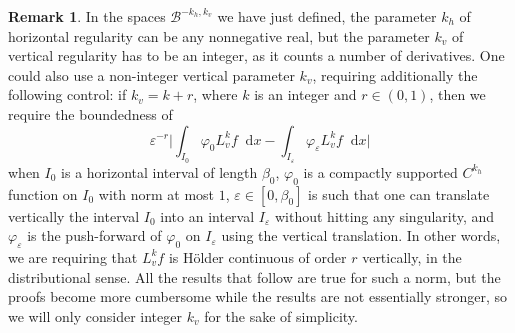 \documentclass[10pt]{amsart}
\newcommand{\boB}{\mathcal{B}}
\newcommand{\dd}{\mathop{}\!\mathrm{d}}
\newcommand{\absgg}[1]{\biggl \lvert#1\biggr\rvert}
\let\epsilon\varepsilon
\let\phi\varphi
\theoremstyle{definition}
\newtheorem{rmk}[thm]{Remark}
\numberwithin{equation}{section}
\begin{document}
\begin{rmk}
\label{rmk:non_integers} In the spaces $\boB^{-k_h, k_v}$ we have just
defined, the parameter $k_h$ of horizontal regularity can be any nonnegative
real, but the parameter $k_v$ of vertical regularity has to be an integer, as
it counts a number of derivatives. One could also use a non-integer vertical
parameter $k_v$, requiring additionally the following control: if $k_v = k +
r$, where $k$ is an integer and $r\in(0,1)$, then we require the boundedness
of
\begin{equation*}
\epsilon^{-r} \absgg{\int_{I_0} \phi_0 L_v^k f \dd x -\int_{I_\epsilon} \phi_\epsilon L_v^k f \dd x}
\end{equation*}
when $I_0$ is a horizontal interval of length $\beta_0$, $\phi_0$ is a
compactly supported $C^{k_h}$ function on $I_0$ with norm at most $1$,
$\epsilon\in [0,\beta_0]$ is such that one can translate vertically the
interval $I_0$ into an interval $I_\epsilon$ without hitting any singularity,
and $\phi_\epsilon$ is the push-forward of $\phi_0$ on $I_\epsilon$ using the
vertical translation. In other words, we are requiring that $L_v^k f$ is
Hölder continuous of order $r$ vertically, in the distributional sense. All
the results that follow are true for such a norm, but the proofs become more
cumbersome while the results are not essentially stronger, so we will only
consider integer $k_v$ for the sake of simplicity.
\end{rmk}
\end{document}
